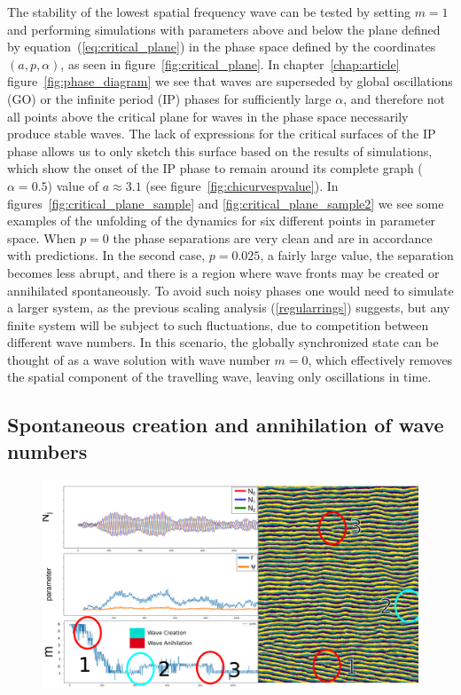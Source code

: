 The stability of the lowest spatial frequency wave can be tested by setting $m=1$ and performing simulations with parameters above and
below the plane defined by equation~(\ref{eq:critical_plane}) in the phase space defined by the coordinates $(a,p,\alpha)$, as seen in
figure~\ref{fig:critical_plane}. In chapter~\ref{chap:article} figure~\ref{fig:phase_diagram} we see that waves are superseded by
global oscillations (GO) or the infinite period (IP) phases for sufficiently large $\alpha$, and therefore not all points above the
critical plane for waves in the phase space necessarily produce stable waves. The lack of expressions for the critical surfaces of the
IP phase allows us to only sketch this surface based on the results of simulations, which show the onset of the IP phase to remain
around its complete graph ($\alpha=0.5$) value of $a\approx3.1$ (see figure~\ref{fig:chicurvespvalue}). In
figures~\ref{fig:critical_plane_sample} and \ref{fig:critical_plane_sample2} we see some examples of the unfolding of the dynamics for
six different points in parameter space. When $p=0$ the phase separations are very clean and are in accordance with predictions. In the
second case, $p=0.025$, a fairly large value, the separation becomes less abrupt, and there is a region where wave fronts may be
created or annihilated spontaneously. To avoid such noisy phases one would need to simulate a larger system, as the previous scaling
analysis (\ref{regularrings}) suggests, but any finite system will be subject to such fluctuations, due to competition between
different wave numbers. In this scenario, the globally synchronized state can be thought of as a wave solution with wave number $m=0$,
which effectively removes the spatial component of the travelling wave, leaving only oscillations in time.

\subsection*{Spontaneous creation and annihilation of wave numbers}

\begin{figure}
  \centering
  \includegraphics[width=\textwidth]{fig/chap4/annihilation.png}
  \caption{}
  \label{fig:annihilation}
\end{figure}

